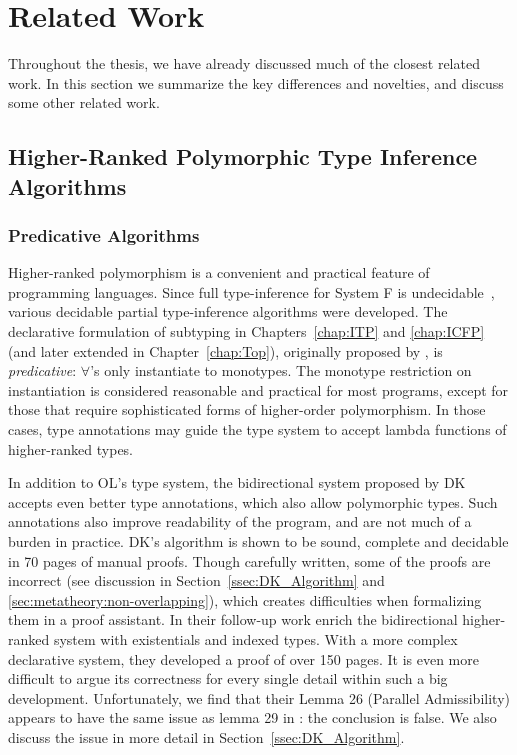 \chapter{Related Work}
\label{chap:related}

Throughout the thesis, we have already discussed much of the closest related work.
In this section we summarize the key differences and novelties,
and discuss some other related work.

\section{Higher-Ranked Polymorphic Type Inference Algorithms}

\subsection{Predicative Algorithms}

Higher-ranked polymorphism is a convenient and practical feature of
programming languages.  Since full type-inference for System F is
undecidable~\citep{wells1999typability}, various decidable partial
type-inference algorithms were developed.
The declarative formulation of subtyping in Chapters~\ref{chap:ITP} and \ref{chap:ICFP}
(and later extended in Chapter~\ref{chap:Top}),
originally proposed by \citet{odersky1996putting}, is \emph{predicative}:
$\forall$'s only instantiate to monotypes.  The monotype restriction
on instantiation is considered reasonable and practical for most
programs, except for those that require sophisticated forms of
higher-order polymorphism.
In those cases, type annotations may guide the type system to
accept lambda functions of higher-ranked types.

In addition to OL's type system,
the bidirectional system proposed by DK~\citep{dunfield2013complete}
accepts even better type annotations, which also allow polymorphic types.
Such annotations also improve readability of the program,
and are not much of a burden in practice.
DK's algorithm is shown to be sound, complete and decidable in 70 pages of manual proofs.
Though carefully written, some of the proofs are incorrect
(see discussion in Section~\ref{ssec:DK_Algorithm} and
\ref{sec:metatheory:non-overlapping}),
which creates difficulties when formalizing them in a proof assistant.
In their follow-up work \citet{DunfieldIndexed} enrich the bidirectional higher-ranked system with
existentials and indexed types.
With a more complex declarative system, they developed a proof of over 150 pages.
It is even more difficult to argue its correctness for every single detail
within such a big development.
Unfortunately, we find that their Lemma 26 (Parallel Admissibility) appears to have the same issue 
as lemma 29 in \citep{dunfield2013complete}: the conclusion is false. We also discuss
the issue in more detail in Section~\ref{ssec:DK_Algorithm}.

